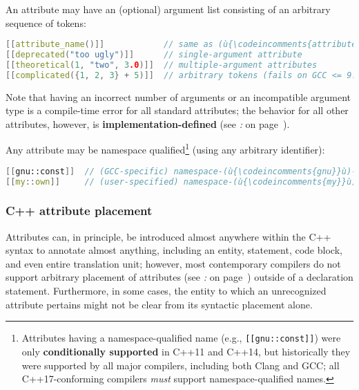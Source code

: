\noindent An attribute may have an (optional) argument list consisting of an
arbitrary sequence of tokens:

\begin{lstlisting}[language=C++]
[[attribute_name()]]            // same as (ù{\codeincomments{attribute\_name}}ù)
[[deprecated("too ugly")]]      // single-argument attribute
[[theoretical(1, "two", 3.0)]]  // multiple-argument attributes
[[complicated({1, 2, 3} + 5)]]  // arbitrary tokens (fails on GCC <= 9.2)
\end{lstlisting}
    
\noindent Note that having an incorrect number of arguments or an incompatible
argument type is a compile-time error for all standard attributes; \pagebreak%
the behavior for all other attributes, 
 however, is
\textbf{implementation-defined} (see {\it{}:} {\it{}} on page~\pageref{unrecognized-attributes-have-implementation-defined-behavior}).

Any attribute may be namespace qualified{\cprotect\footnote{Attributes
having a namespace-qualified name (e.g., \texttt{[[gnu::const]]}) were
only \textbf{conditionally supported} in C++11 and C++14, but
historically they were supported by all major compilers, including both
Clang and GCC; all C++17-conforming compilers \textit{must} support namespace-qualified names.}} (using any arbitrary identifier):

\begin{lstlisting}[language=C++]
[[gnu::const]]  // (GCC-specific) namespace-(ù{\codeincomments{gnu}}ù)-qualified (ù{\codeincomments{const}}ù) attribute
[[my::own]]     // (user-specified) namespace-(ù{\codeincomments{my}}ù)-qualified (ù{\codeincomments{own}}ù) attribute
\end{lstlisting}
    

\subsubsection[C++ attribute placement]{C++ attribute placement}\label{c++-attribute-placement}

Attributes can, in principle, be introduced almost anywhere within the
C++ syntax to annotate almost anything, including an entity,
statement, code block, and even entire translation
unit; however, most contemporary compilers do not support arbitrary
placement of attributes (see {\it{}:} {\it{}} on page~\pageref{probing-where-attributes-are-permitted-in-the-compiler’s-c++-grammar}) outside of a
declaration statement. Furthermore, in some cases, the entity to
which an unrecognized attribute pertains might not be clear from its
syntactic placement alone.

